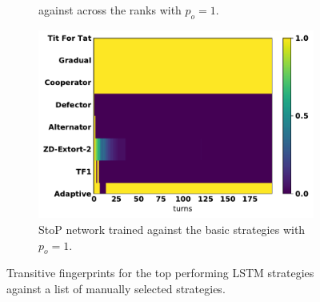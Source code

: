 \begin{figure}[!htbp]
\begin{subfigure}{.32\textwidth}
{        against across the ranks with $p_o=1$.}
    \end{subfigure}\hfill
    \begin{subfigure}{.32\textwidth}
        \includegraphics[width=\textwidth]{src/chapters/07/img/s_t_p_basic_against_seven_opponents.pdf}
        \caption{StoP network trained
        against the basic strategies with $p_o=1$.}
    \end{subfigure}
    \caption{Transitive fingerprints for the top performing LSTM strategies against
    a list of manually selected strategies.}\label{fig:transitive_fingerprints_against_seven}
\end{figure}

\begin{table}[!htbp]
    \begin{center}
    \resizebox{\textwidth}{!}{
        
    }
\end{center}
\caption{Scores per trained for an eight strategies tournament. The LSTM strategy
corresponds to the strategy based on the StoS network trained
against all strategies with $p_o=1$. The tournament was of 200 turns and was
repeated 50 times.}\label{table:scores_s_to_s_against_seven}
\end{table}

\begin{table}[!htbp]
    \begin{center}
    \resizebox{\textwidth}{!}{
        
    }
\end{center}
\caption{Scores per trained for an eight strategies tournament. The LSTM
strategy corresponds to the strategy based on the StoP network trained against
across the ranks strategies with $p_o=1$. The tournament was of 200 turns and
was repeated 50 times.}\label{table:scores_s_to_p_twenty_against_seven}
\end{table}

